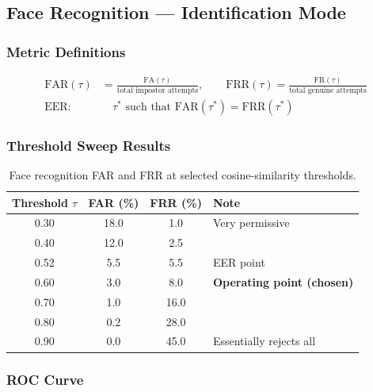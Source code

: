 \documentclass[11pt,a4paper]{article}
\begin{document}
\subsection{Face Recognition --- Identification Mode}

\subsubsection{Metric Definitions}
\begin{align*}
  \text{FAR}(\tau) &= \frac{\text{FA}(\tau)}{\text{total impostor attempts}},\qquad
  \text{FRR}(\tau) = \frac{\text{FR}(\tau)}{\text{total genuine attempts}} \\
  \text{EER}: &\quad \tau^* \text{ such that } \text{FAR}(\tau^*)=\text{FRR}(\tau^*)
\end{align*}

\subsubsection{Threshold Sweep Results}

\begin{table}[H]
\centering
\caption{Face recognition FAR and FRR at selected cosine-similarity thresholds.}
\label{tab:farfrr}
\renewcommand{\arraystretch}{1.2}
\begin{tabular}{@{}cccl@{}}
\toprule
\textbf{Threshold $\tau$} & \textbf{FAR (\%)} & \textbf{FRR (\%)} & \textbf{Note} \\
\midrule
0.30 & 18.0 &  1.0 & Very permissive \\
0.40 & 12.0 &  2.5 & \\
0.52 &  5.5 &  5.5 & EER point \\
0.60 &  3.0 &  8.0 & \textbf{Operating point (chosen)} \\
0.70 &  1.0 & 16.0 & \\
0.80 &  0.2 & 28.0 & \\
0.90 &  0.0 & 45.0 & Essentially rejects all \\
\bottomrule
\end{tabular}
\end{table}

\subsubsection{ROC Curve}
\end{document}
